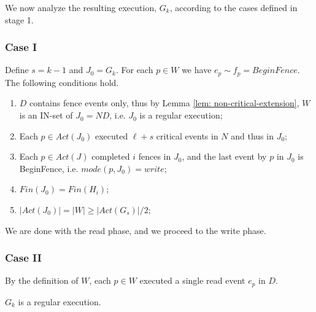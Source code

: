 We now analyze the resulting execution, $G_k$, according to the cases defined in stage 1.
\subsubsection*{\hspace{5mm} Case I}
Define $s=k-1$ and $J_0 = G_k$. For each $p \in W$ we have $e_p \sim f_p = BeginFence$. The following conditions hold.
\begin{enumerate}
	\item $D$ contains fence events only, thus by Lemma \ref{lem: non-critical-extension}, $W$ is an IN-set of $J_0 = N D$, i.e. $J_0$ is a regular execution;
	\item Each $p \in Act(J_0)$ executed $\ell+s$ critical events in $N$ and thus in $J_0$;
	\item Each $p \in Act(J)$ completed $i$ fences in $J_0$, and the last event by $p$ in $J_0$ is BeginFence, i.e. $mode(p,J_0) = write$;
	\item $Fin(J_0) = Fin(H_i)$;
	\item $|Act(J_0)| = |W| \geq |Act(G_s)|/2$;
\end{enumerate}

We are done with the read phase, and we proceed to the write phase.

\subsubsection*{\hspace{5mm} Case II}
By the definition of $W$, each $p \in W$ executed a single read event $e_p$ in $D$.

\begin{claim-subsection} \label{claim: G_k-is-regular}
	$G_k$ is a regular execution.
\end{claim-subsection}


